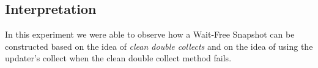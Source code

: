 \subsection{Interpretation}
In this experiment we were able to observe how a Wait-Free Snapshot can be
constructed based on the idea of \textit{clean double collects} and on the idea
of using the updater's collect when the clean double collect method fails.
